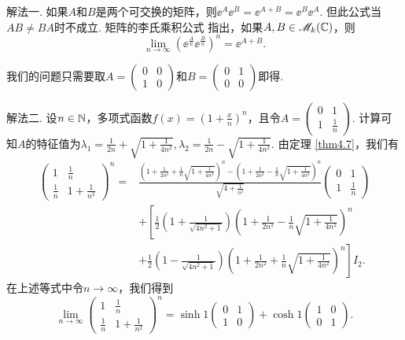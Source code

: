 \begin{solution}
  {\kaishu 解法一.} 如果$A$和$B$是两个可交换的矩阵，则$\ee^A\ee^B=\ee^{A+B}=\ee^B\ee^A$. 但此公式当$AB\ne BA$时不成立. 矩阵的李氏乘积公式 \cite{37} 指出，如果$A,B\in\mathscr M_k(\mathbb C)$，则
  \[
    \lim_{n\to\infty} \left( \ee^{\frac An} \ee^{\frac Bn} \right)^n = \ee^{A+B}.
  \]

  我们的问题只需要取$A=\begin{pmatrix}
    0 & 0 \\
    1 & 0
  \end{pmatrix}$和$B=\begin{pmatrix}
    0 & 1 \\
    0 & 0
  \end{pmatrix}$即得.

  {\kaishu 解法二.} 设$n\in\mathbb N$，多项式函数$f(x)=\left(1+\frac xn\right)^n$，且令$A=\begin{pmatrix}
    0 & 1 \\
    1 & \frac1n
  \end{pmatrix}$. 计算可知$A$的特征值为$\lambda_1=\frac1{2n}+\sqrt{1+\frac1{4n^2}},\lambda_2
  =\frac1{2n}-\sqrt{1+\frac1{4n^2}}$. 由定理 \ref{thm4.7}，我们有
  \begin{align*}
    \begin{pmatrix}
      1 & \frac1n \\
      \frac1n & 1+\frac1{n^2}
    \end{pmatrix}^n = {}& \frac{
      \left( 1+\frac1{2n^2} + \frac1n\sqrt{1+\frac1{4n^2}} \right)^n - \left( 1+\frac1{2n^2} - \frac1n\sqrt{1+\frac1{4n^2}} \right)^n
    }{\sqrt{4+\frac1{n^2}}} \begin{pmatrix}
      0 & 1 \\
      1 & \frac1n
    \end{pmatrix} \\
    & + \left[ \frac12 \left(1 + \frac1{\sqrt{4n^2+1}}\right) \left( 1+\frac1{2n^2} - \frac1n\sqrt{1+\frac1{4n^2}} \right)^n \right. \\
    & + \left. \frac12 \left(1 - \frac1{\sqrt{4n^2+1}}\right) \left( 1+\frac1{2n^2} + \frac1n\sqrt{1+\frac1{4n^2}} \right)^n  \right]I_2.
  \end{align*}
  在上述等式中令$n\to\infty$，我们得到
  \[
    \lim_{n\to\infty} \begin{pmatrix}
      1 & \frac1n \\
      \frac1n & 1+\frac1{n^2}
    \end{pmatrix}^n = \sinh 1\begin{pmatrix}
      0 & 1 \\
      1 & 0
    \end{pmatrix} + \cosh 1 \begin{pmatrix}
      1 & 0 \\
      0 & 1
    \end{pmatrix}.
  \]
\end{solution}

